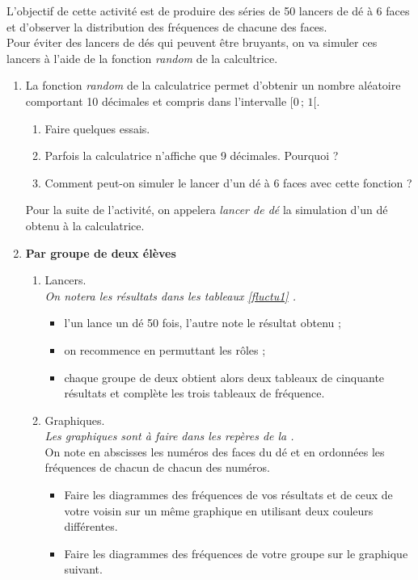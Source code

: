 \begin{act}\label{fluctuact1}
L'objectif de cette activit\'e est de produire des s\'eries de 50 lancers de d\'e \`a 6 faces et d'observer la distribution des fr\'equences de chacune des faces.\\
Pour \'eviter des lancers de d\'es qui peuvent \^etre bruyants, on va simuler ces lancers \`a l'aide de la fonction \emph{random} de la calcultrice.
\begin{enumerate}
  \item La fonction \emph{random} de la calculatrice permet d'obtenir un nombre al\'eatoire comportant 10 d\'ecimales et compris dans l'intervalle $[0\,;\,1[$.
    \begin{enumerate}
     \item Faire quelques essais.
     \item Parfois la calculatrice n'affiche que 9 d\'ecimales. Pourquoi ?
     \item Comment peut-on simuler le lancer d'un d\'e \`a 6 faces avec cette fonction ?
    \end{enumerate}
  Pour la suite de l'activit\'e, on appelera \emph{lancer de d\'e} la simulation d'un d\'e obtenu \`a la calculatrice.
  \item \textbf{Par groupe de deux \'el\`eves}
    \begin{enumerate}
	\item Lancers.\\
	\emph{On notera les r\'esultats dans les tableaux \ref{fluctu1} .}
	    \begin{itemize}
		    \item l'un lance un d\'e 50 fois, l'autre note le r\'esultat obtenu ;
		    \item on recommence en permuttant les rôles ;
		    \item chaque groupe de deux obtient alors deux tableaux de cinquante r\'esultats et compl\`ete les trois tableaux de fr\'equence.
	    \end{itemize}



				\item Graphiques.\\ \emph{Les graphiques sont \`a faire dans les rep\`eres de la .}\\
				On note en abscisses les num\'eros des faces du d\'e et en ordonn\'ees les fr\'equences de chacun de chacun des num\'eros.
						\begin{itemize}
							\item Faire les diagrammes des fr\'equences de vos r\'esultats et de ceux de votre voisin sur un m\^eme graphique en utilisant deux couleurs diff\'erentes.
							\item Faire les diagrammes des fr\'equences de votre groupe sur le graphique suivant.
						\end{itemize}


\end{enumerate}
\end{enumerate}
\end{act}
